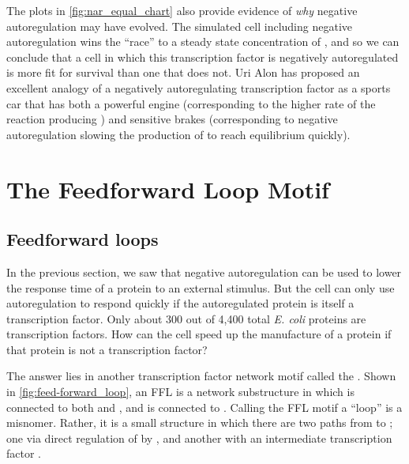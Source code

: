The plots in \autoref{fig:nar_equal_chart} also provide evidence of \textit{why} negative autoregulation may have evolved. The simulated cell including negative autoregulation wins the ``race'' to a steady state concentration of , and so we can conclude that a cell in which this transcription factor is negatively autoregulated is more fit for survival than one that does not. Uri Alon has proposed an excellent analogy of a negatively autoregulating transcription factor as a sports car that has both a powerful engine (corresponding to the higher rate of the reaction producing ) and sensitive brakes (corresponding to negative autoregulation slowing the production of  to reach equilibrium quickly).\\

\FloatBarrier
{}

\section{The Feedforward Loop Motif}
\label{sec:the_feedforward_loop_motif}

\subsection{Feedforward loops}

In the previous section, we saw that negative autoregulation can be used to lower the response time of a protein to an external stimulus. But the cell can only use autoregulation to respond quickly if the autoregulated protein is itself a transcription factor. Only about 300 out of 4,400 total \textit{E. coli} proteins are transcription factors. How can the cell speed up the manufacture of a protein if that protein is not a transcription factor?

The answer lies in another transcription factor network motif called the . Shown in \autoref{fig:feed-forward_loop}, an FFL is a network substructure in which  is connected to both  and , and  is connected to . Calling the FFL motif a ``loop'' is a misnomer. Rather, it is a small structure in which there are two paths from  to ; one via direct regulation of  by , and another with an intermediate transcription factor .

